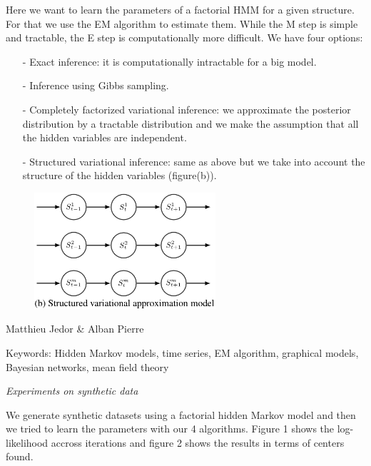 \documentclass[10pt,a4paper]{report}
\begin{document}
\Large{

Here we want to learn the parameters of a factorial HMM for a given structure. For that we use the EM algorithm to estimate them. While the M step is simple and tractable, the E step is computationally more difficult. We have four options:

\begin{itemize}
	\item[-]Exact inference: it is computationally intractable for a big model.
	\item[-]Inference using Gibbs sampling.
	\item[-]Completely factorized variational inference: we approximate the posterior distribution by a tractable distribution and we make the assumption that all the hidden variables are independent.
	\item[-]Structured variational inference: same as above but we take into account the structure of the hidden variables (figure(b)).
\end{itemize}

}

\begin{figure}[h]
	\centering
	\includegraphics[width=0.6\textwidth]{sva.png}
	\label{fig:b}
\end{figure}








\newpage
\begin{center}
\end{center}
\vspace{5pt}
\begin{center}
	\LARGE{Matthieu Jedor \& Alban Pierre}
	\vspace{15pt}
	
	\Large{Keywords: Hidden Markov models, time series, EM algorithm, graphical models, Bayesian networks, mean field
theory}
\end{center}
\vspace{30pt}
\begin{center}
\Huge{\textit{Experiments on synthetic data}}
\end{center}
\vspace{20pt}
\Large{
	We generate synthetic datasets using a factorial hidden Markov model and then we tried to learn the parameters with our 4 algorithms. Figure 1 shows the log-likelihood accross iterations and figure 2 shows the results in terms of centers found.
	
}
\end{document}
